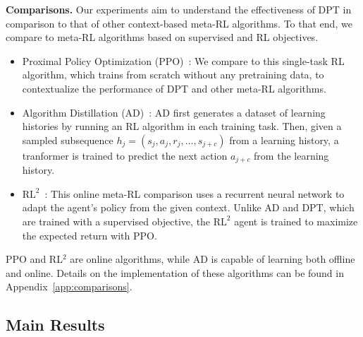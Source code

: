 \documentclass{article}
\begin{document}
\textbf{Comparisons.} Our experiments aim to understand the effectiveness of DPT in comparison to that of other context-based meta-RL algorithms. To that end, we compare to meta-RL algorithms based on supervised and RL objectives.
\begin{itemize}[leftmargin=1em,noitemsep]
    \item Proximal Policy Optimization (PPO)~\citep{schulman2017proximal}: We compare to this single-task RL algorithm, which trains from scratch without any pretraining data, to contextualize the performance of DPT and other meta-RL algorithms.
    \item Algorithm Distillation (AD)~\citep{laskin2022context}: AD first generates a dataset of learning histories by running an RL algorithm in each training task.
    Then, given a sampled 
    subsequence $h_j = (s_j, a_j, r_j, \dots, s_{j+c})$ from a learning history, a tranformer is trained to predict the next action $a_{j+c}$ from the learning history. 
    \item $\text{RL}^2$~\citep{duan2016rl}: This online meta-RL comparison uses a recurrent neural network to adapt the agent's policy from the given context. Unlike AD and DPT, which are trained with a supervised objective, the $\text{RL}^2$ agent is trained to maximize the expected return with PPO.
\end{itemize}
PPO and RL$^2$ are online algorithms, while AD is capable of learning both offline and online. Details on the implementation of these algorithms can be found in Appendix~\ref{app:comparisons}. 



\subsection{Main Results}
\label{subsec:mdp_main}
\end{document}
